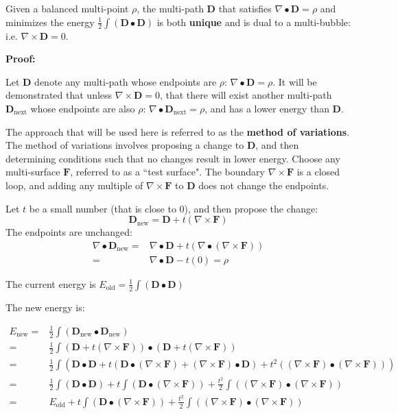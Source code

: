 \begin{thm}
Given a balanced multi-point \(\rho\), the multi-path \(\mathbf{D}\) that satisfies \(\nabla \bullet \mathbf{D} = \rho\) and minimizes the energy \(\frac{1}{2}\int (\mathbf{D} \bullet \mathbf{D})\) is both {\bf unique} and is dual to a multi-bubble: i.e. \(\nabla \times \mathbf{D} = 0\). 
\end{thm}
\textbf{Proof:}

Let \(\mathbf{D}\) denote any multi-path whose endpoints are \(\rho\): \(\nabla \bullet \mathbf{D} = \rho\). It will be demonstrated that unless \(\nabla \times \mathbf{D} = 0\), that there will exist another multi-path \(\mathbf{D}_{\text{next}}\) whose endpoints are also \(\rho\): \(\nabla \bullet \mathbf{D}_{\text{next}} = \rho\), and has a lower energy than \(\mathbf{D}\). 

The approach that will be used here is referred to as the {\bf method of variations}. The method of variations involves proposing a change to \(\mathbf{D}\), and then determining conditions such that no changes result in lower energy. Choose any multi-surface \(\mathbf{F}\), referred to as a ``test surface". The boundary \(\nabla \times \mathbf{F}\) is a closed loop, and adding any multiple of \(\nabla \times \mathbf{F}\) to \(\mathbf{D}\) does not change the endpoints.

Let \(t\) be a small number (that is close to 0), and then propose the change:
\[\mathbf{D}_{\text{new}} = \mathbf{D} + t(\nabla \times \mathbf{F})\]
The endpoints are unchanged:
\begin{align*}
\nabla \bullet \mathbf{D}_{\text{new}} = & \nabla \bullet \mathbf{D} + t(\nabla \bullet (\nabla \times \mathbf{F})) \\ 
= & \nabla \bullet \mathbf{D} - t(0) 
= \rho
\end{align*}

The current energy is \(E_{\text{old}} = \frac{1}{2}\int (\mathbf{D} \bullet \mathbf{D})\)

The new energy is: 

\begin{align*}
E_{\text{new}} = & \frac{1}{2}\int (\mathbf{D}_{\text{new}} \bullet \mathbf{D}_{\text{new}}) \\ 
= & \frac{1}{2}\int (\mathbf{D} + t (\nabla \times \mathbf{F})) \bullet (\mathbf{D} + t (\nabla \times \mathbf{F})) \\ 
= & \frac{1}{2}\int (\mathbf{D} \bullet \mathbf{D} + t(\mathbf{D} \bullet (\nabla \times \mathbf{F}) + (\nabla \times \mathbf{F}) \bullet \mathbf{D}) + t^2((\nabla \times \mathbf{F}) \bullet (\nabla \times \mathbf{F}))) \\
= & \frac{1}{2}\int (\mathbf{D} \bullet \mathbf{D}) + t\int (\mathbf{D} \bullet (\nabla \times \mathbf{F})) + \frac{t^2}{2}\int ((\nabla \times \mathbf{F}) \bullet (\nabla \times \mathbf{F})) \\ 
= & E_{\text{old}} + t\int (\mathbf{D} \bullet (\nabla \times \mathbf{F})) + \frac{t^2}{2}\int ((\nabla \times \mathbf{F}) \bullet (\nabla \times \mathbf{F}))
\end{align*}

